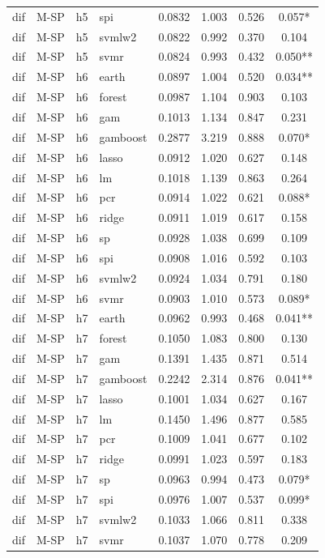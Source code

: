 \begin{ThreePartTable}
\begin{longtable}[t]{llclcccc}
dif & M-SP & h5 & spi & 0.0832 & 1.003 & 0.526 & 0.057*\\
dif & M-SP & h5 & svmlw2 & 0.0822 & 0.992 & 0.370 & 0.104\\
dif & M-SP & h5 & svmr & 0.0824 & 0.993 & 0.432 & 0.050**\\
\addlinespace
dif & M-SP & h6 & earth & 0.0897 & 1.004 & 0.520 & 0.034**\\
dif & M-SP & h6 & forest & 0.0987 & 1.104 & 0.903 & 0.103\\
dif & M-SP & h6 & gam & 0.1013 & 1.134 & 0.847 & 0.231\\
dif & M-SP & h6 & gamboost & 0.2877 & 3.219 & 0.888 & 0.070*\\
dif & M-SP & h6 & lasso & 0.0912 & 1.020 & 0.627 & 0.148\\
dif & M-SP & h6 & lm & 0.1018 & 1.139 & 0.863 & 0.264\\
dif & M-SP & h6 & pcr & 0.0914 & 1.022 & 0.621 & 0.088*\\
dif & M-SP & h6 & ridge & 0.0911 & 1.019 & 0.617 & 0.158\\
dif & M-SP & h6 & sp & 0.0928 & 1.038 & 0.699 & 0.109\\
dif & M-SP & h6 & spi & 0.0908 & 1.016 & 0.592 & 0.103\\
dif & M-SP & h6 & svmlw2 & 0.0924 & 1.034 & 0.791 & 0.180\\
dif & M-SP & h6 & svmr & 0.0903 & 1.010 & 0.573 & 0.089*\\
\addlinespace
dif & M-SP & h7 & earth & 0.0962 & 0.993 & 0.468 & 0.041**\\
dif & M-SP & h7 & forest & 0.1050 & 1.083 & 0.800 & 0.130\\
dif & M-SP & h7 & gam & 0.1391 & 1.435 & 0.871 & 0.514\\
dif & M-SP & h7 & gamboost & 0.2242 & 2.314 & 0.876 & 0.041**\\
dif & M-SP & h7 & lasso & 0.1001 & 1.034 & 0.627 & 0.167\\
dif & M-SP & h7 & lm & 0.1450 & 1.496 & 0.877 & 0.585\\
dif & M-SP & h7 & pcr & 0.1009 & 1.041 & 0.677 & 0.102\\
dif & M-SP & h7 & ridge & 0.0991 & 1.023 & 0.597 & 0.183\\
dif & M-SP & h7 & sp & 0.0963 & 0.994 & 0.473 & 0.079*\\
dif & M-SP & h7 & spi & 0.0976 & 1.007 & 0.537 & 0.099*\\
dif & M-SP & h7 & svmlw2 & 0.1033 & 1.066 & 0.811 & 0.338\\
dif & M-SP & h7 & svmr & 0.1037 & 1.070 & 0.778 & 0.209\\

\end{longtable}
\end{ThreePartTable}
